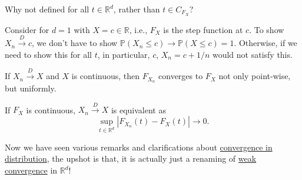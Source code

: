 \begin{problem*}
	Why not defined for all \(t \in \mathbb{R} ^d\), rather than \(t \in C_{F_X}\)?
\end{problem*}
\begin{answer}
	Consider for \(d = 1\) with \(X = c \in \mathbb{R} \), i.e., \(F_X\) is the step function at \(c\). To show \(X_n \overset{D}{\to } c\), we don't have to show \(\mathbb{P} (X_n \leq c) \to \mathbb{P} (X \leq c) = 1\). Otherwise, if we need to show this for all \(t\), in particular, \(c\), \(X_n = c + 1 / n\) would not satisfy this.
\end{answer}

If \(X_n \overset{D}{\to } X\) and \(X\) is continuous, then \(F_{X_n}\) converges to \(F_X\) not only point-wise, but uniformly.

\begin{remark}
	If \(F_X\) is continuous, \(X_n \overset{D}{\to } X\) is equivalent as
	\[
		\sup _{t\in \mathbb{R} ^d} \left\vert F_{X_n} (t) - F_X(t) \right\vert \to 0.
	\]
\end{remark}

Now we have seen various remarks and clarifications about \hyperref[def:converge-in-distribution]{convergence in distribution}, the upshot is that, it is actually just a renaming of \hyperref[def:converge-weakly]{weak convergence} in \(\mathbb{R} ^d\)!

